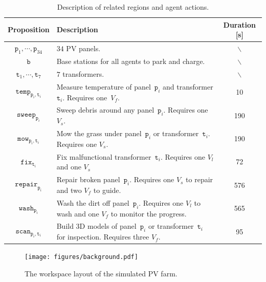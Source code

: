 \begin{table}[t]
	\centering
	\caption{Description of related regions and agent actions.}
	\label{fig:symbols}
	\begin{tabular}{|c|m{}|c|}\hline
		\textbf{Proposition} & \textbf{Description}\centering & \textbf{Duration} [s]\\ \hline
		$\texttt{p}_1,\cdots,\texttt{p}_{34}$ & $34$ PV panels. & $\backslash$ \\ \hline
		$\texttt{b}$ & Base stations for all agents to park and charge. & $\backslash$ \\ \hline
		$\texttt{t}_1,\cdots,\texttt{t}_7$ & $7$ transformers. & $\backslash$ \\ \hline
		$\texttt{temp}_{\texttt{p}_i,\texttt{t}_i}$ &
		Measure temperature of panel~$\texttt{p}_i$ and transformer $\texttt{t}_i$.
		Requires one~$V_f$. & 10 \\ \hline
		$\texttt{sweep}_{\texttt{p}_i}$& Sweep debris around any panel~$\texttt{p}_i$.
		Requires one $V_s$. & 190\\ \hline
		$\texttt{mow}_{\texttt{p}_i,\texttt{t}_i}$ &
		Mow the grass under panel~$\texttt{p}_i$ or transformer~$\texttt{t}_i$.
		Requires one $V_s$. & 190\\ \hline
		$\texttt{fix}_{\texttt{t}_i}$ &
		Fix malfunctional transformer~$\texttt{t}_i$.
		Requires one $V_l$ and one $V_s$ & 72\\ \hline
		$\texttt{repair}_{\texttt{p}_i}$ &
		Repair broken panel~$\texttt{p}_i$.
		Requires one $V_s$ to repair and two $V_f$ to guide. & 576\\ \hline
		$\texttt{wash}_{\texttt{p}_i}$ &
		Wash the dirt off panel~$\texttt{p}_i$.
		Requires one $V_l$ to wash and one $V_f$ to monitor the progress. & 565\\ \hline
		$\texttt{scan}_{\texttt{p}_i,\texttt{t}_i}$ &
		Build 3D models of panel~$\texttt{p}_i$ or transformer~$\texttt{t}_i$
		for inspection. Requires three $V_f$. & 95\\ \hline
	\end{tabular}
\end{table}
\begin{figure}
	\texttt{[image: figures/background.pdf]}
	\caption{The workspace layout of the simulated PV farm.}
	\label{fig:workspace}
\end{figure}

